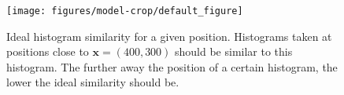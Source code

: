 \begin{figure}[h!]
\begin{center}
\texttt{[image: figures/model-crop/default\_figure]}
\caption{{\label{fig:model} Ideal
    histogram similarity for a given position. Histograms taken at
    positions close to $\textbf{x} = (400, 300)$ should be similar to
    this histogram. The further away the position of a certain
    histogram, the lower the ideal similarity should be.%
}}
\end{center}
\end{figure}